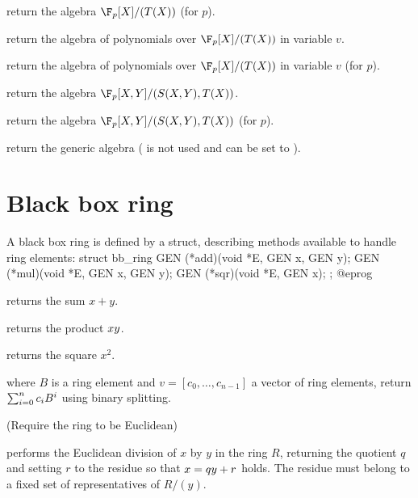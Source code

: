 return the algebra $\F_p[X]/(T(X))$ (for  $p$).

return the algebra of polynomials over $\F_p[X]/(T(X))$ in variable $v$.

return the algebra of polynomials over $\F_p[X]/(T(X))$ in variable $v$ (for
 $p$).

return the algebra $\F_p[X,Y]/(S(X,Y),T(X))$.

return the algebra $\F_p[X,Y]/(S(X,Y),T(X))$ (for  $p$).

return the generic algebra ( is not used and can be set to ).

\section{Black box ring}

A black box ring is defined by a  struct, describing methods
available to handle ring elements:
\bprog
struct bb_ring
{
  GEN (*add)(void *E, GEN x, GEN y);
  GEN (*mul)(void *E, GEN x, GEN y);
  GEN (*sqr)(void *E, GEN x);
};
@eprog

 returns the sum $x+y$.

 returns the product $x\*y$.

 returns the square $x^2$.

where $B$ is a ring element and $v=[c_0,\ldots,c_{n-1}]$ a vector of ring elements,
return $\sum_{i=0}^n c_i\*B^i$ using binary splitting.


(Require the ring to be Euclidean)

 performs the Euclidean division of $x$ by $y$ in the ring
$R$, returning the quotient $q$ and setting $r$ to the residue so that
$x=q\*y+r$ holds. The residue must belong to a fixed set of representatives of
$R/(y)$.

